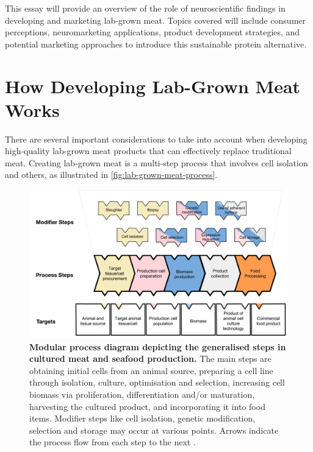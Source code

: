\documentclass[10pt]{article}
\begin{document}
\begin{sloppypar}
  This essay will provide an overview of the role of neuroscientific findings in developing and marketing lab-grown meat. Topics covered will include consumer perceptions, neuromarketing applications, product development strategies, and potential marketing approaches to introduce this sustainable protein alternative.

  \section{How Developing Lab-Grown Meat Works}
  \label{sec:developing-lab-grown-meat}

  There are several important considerations to take into account when developing high-quality lab-grown meat products that can effectively replace traditional meat. Creating lab-grown meat is a multi-step process that involves cell isolation and others, as illustrated in \autoref{fig:lab-grown-meat-process}.

  \begin{figure}[ht]
    \centering
    \includegraphics[width=\textwidth]{figures/lab-grown-meat-step.png}
    \caption[Modular process diagram depicting the generalised steps in cultured meat and seafood production.]{\textbf{Modular process diagram depicting the generalised steps in cultured meat and seafood production.} The main steps are obtaining initial cells from an animal source, preparing a cell line through isolation, culture, optimisation and selection, increasing cell biomass via proliferation, differentiation and/or maturation, harvesting the cultured product, and incorporating it into food items. Modifier steps like cell isolation, genetic modification, selection and storage may occur at various points. Arrows indicate the process flow from each step to the next \citep{ong_food_2021}.}
    \label{fig:lab-grown-meat-process}
  \end{figure}


\end{sloppypar}
\end{document}
